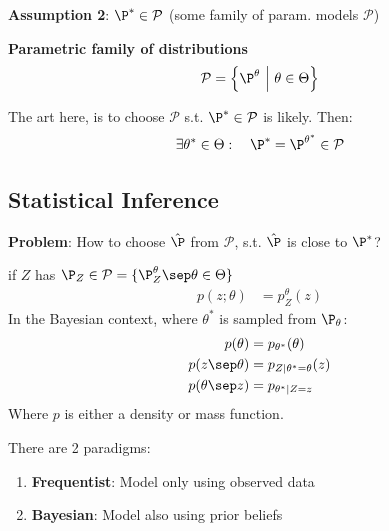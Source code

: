 \newpage

\textbf{Assumption 2}: $\P^* \in \mathcal{P}$ (some family of param. models $\mathcal{P}$)

 \textbf{Parametric family of distributions}\\
$$
    \mathcal{P} = \Bigl\{ \P^\theta \ \Big|\ \theta \in \Theta \Bigr\}
$$

The art here, is to choose $\mathcal{P}$ s.t. $\P^* \in \mathcal{P}$ is likely. Then:
$$
    \exists \theta^* \in \Theta:\quad \P^* = \P^{\theta^*} \in \mathcal{P}
$$

\subsection{Statistical Inference}

\textbf{Problem}: How to choose $\hat{\P}$ from $\mathcal{P}$, s.t. $\hat{\P}$ is close to $\P^*$?\\

{\footnotesize
    \notation if $Z$ has $\P_Z \in \mathcal{P} = \{ \P^\theta_Z \sep \theta \in \Theta \}$
    \begin{align*}
        p(z;\theta)         &= p_Z^\theta(z)
    \end{align*}
    \notation In the Bayesian context, where $\theta^*$ is sampled from $\P_\theta$:
    \begin{align*}
        p(\theta)           &= p_{\theta^*}(\theta)     \\
        p(z \sep \theta)    &= p_{Z|\theta^*=\theta}(z) \\
        p(\theta \sep z)    &= p_{\theta^*|Z=z} 
    \end{align*}
    Where $p$ is either a density or mass function.
}

There are 2 paradigms:
\begin{enumerate}
    \item \textbf{Frequentist}: Model only using observed data
    \item \textbf{Bayesian}: Model also using prior beliefs
\end{enumerate}

